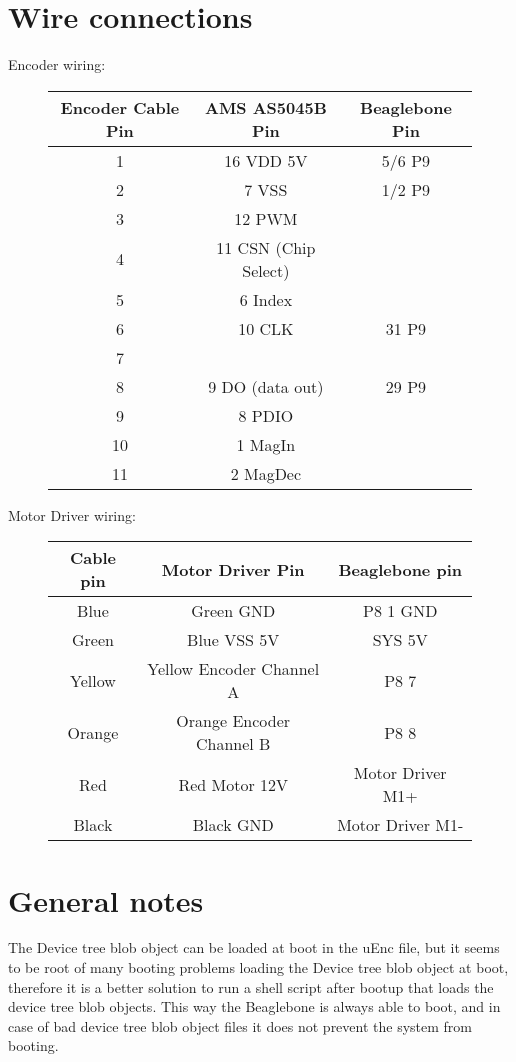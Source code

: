 \section{Wire connections}
Encoder wiring:\\
\begin{figure}[H]
\centering
\begin{tabular}{|c|c|c|}
\hline
Encoder Cable Pin & AMS AS5045B Pin & Beaglebone Pin \\ \hline
1 & 16 VDD 5V & 5/6 P9 \\ \hline
2 & 7 VSS & 1/2 P9 \\ \hline
3 & 12 PWM & \\ \hline
4 & 11 CSN (Chip Select) & \\ \hline
5 & 6 Index & \\ \hline
6 & 10 CLK & 31 P9 \\ \hline
7 & & \\ \hline
8 & 9 DO (data out) & 29 P9 \\ \hline
9 & 8 PDIO & \\ \hline
10 & 1 MagIn & \\ \hline
11 & 2 MagDec & \\ \hline 
\end{tabular}
\end{figure}


Motor Driver wiring:
\begin{figure}[H]
\centering
\begin{tabular}{|c|c|c|}
\hline
Cable pin & Motor Driver Pin & Beaglebone pin \\ \hline 
Blue & Green GND & P8 1 GND\\ \hline
Green & Blue VSS 5V & SYS 5V\\ \hline
Yellow & Yellow Encoder Channel A & P8 7\\ \hline
Orange & Orange Encoder Channel B & P8 8\\ \hline
Red & Red Motor 12V & Motor Driver M1+\\ \hline
Black & Black GND & Motor Driver M1-\\ \hline
\end{tabular}
\end{figure}

\section{General notes}
The Device tree blob object can be loaded at boot in the uEnc file, but it seems to be root of many booting problems loading the Device tree blob object at boot, therefore it is a better solution to run a shell script after bootup that loads the device tree blob objects. This way the Beaglebone is always able to boot, and in case of bad device tree blob object files it does not prevent the system from booting.\\

